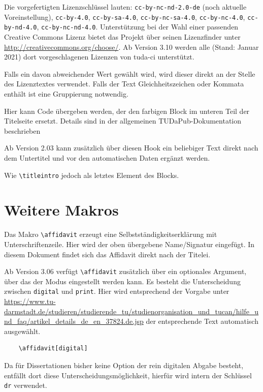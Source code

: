 \documentclass[
	ngerman,
	ruledheaders=chapter,%
	class=book,%
	thesis={
		type=dr,
		dr=rernat
	},
	accentcolor=9c,%
	custommargins=true,%
	marginpar=false,%
	fontsize=11pt,%
]{tudapub}
\let\code\texttt
\let\tbs\textbackslash
\begin{document}
\begin{description}
	Die vorgefertigten Lizenzschlüssel lauten: \verb+cc-by-nc-nd-2.0-de+ (noch aktuelle Voreinstellung), \verb+cc-by-4.0+, \verb+cc-by-sa-4.0+, \verb+cc-by-nc-sa-4.0+, \verb+cc-by-nc-4.0+, \verb+cc-by-nd-4.0+, \verb+cc-by-nc-nd-4.0+.
	Unterstützung bei der Wahl einer passenden Creative Commons Lizenz bietet das Projekt über seinen Lizenzfinder unter \url{http://creativecommons.org/choose/}.
	Ab Version 3.10 werden alle (Stand: Januar 2021) dort vorgeschlagenen Lizenzen von tuda-ci unterstützt.

	Falls ein davon abweichender Wert gewählt wird, wird dieser direkt an der Stelle des Lizenztextes verwendet. Falls der Text Gleichheitszeichen oder Kommata enthält ist eine Gruppierung notwendig.
	\item[titlegraphic] Hier kann Code übergeben werden, der den farbigen Block im unteren Teil der Titelseite ersetzt. Details sind in der allgemeinen TUDaPub-Dokumentation beschrieben \cite{tudapub}
	\item[titleintro] Ab Version 2.03 kann zusätzlich über diesen Hook ein beliebiger Text direkt nach dem Untertitel und vor den automatischen Daten ergänzt werden.
	\item[titleaddendum] Wie \code{\tbs{}titleintro} jedoch als letztes Element des Blocks.
\end{description}

\section{Weitere Makros}
Das Makro \verb+\affidavit+ erzeugt eine Selbstständigkeitserklärung mit Unterschriftenzeile. Hier wird der oben übergebene Name/Signatur eingefügt.
In diesem Dokument findet sich das Affidavit direkt nach der Titelei.

Ab Version 3.06 verfügt \verb+\affidavit+ zusätzlich über ein optionales Argument, über das der Modus eingestellt werden kann.
Es besteht die Unterscheidung zwischen \verb+digital+ und \verb+print+. Hier wird entsprechend der Vorgabe unter \url{https://www.tu-darmstadt.de/studieren/studierende_tu/studienorganisation_und_tucan/hilfe_und_faq/artikel_details_de_en_37824.de.jsp} der entsprechende Text automatisch ausgewählt.

\begin{verbatim}
	\affidavit[digital]
\end{verbatim}

Da für Dissertationen bisher keine Option der rein digitalen Abgabe besteht, entfällt dort diese Unterscheidungsmöglichkeit, hierfür wird intern der Schlüssel \verb+dr+ verwendet.
\end{document}
